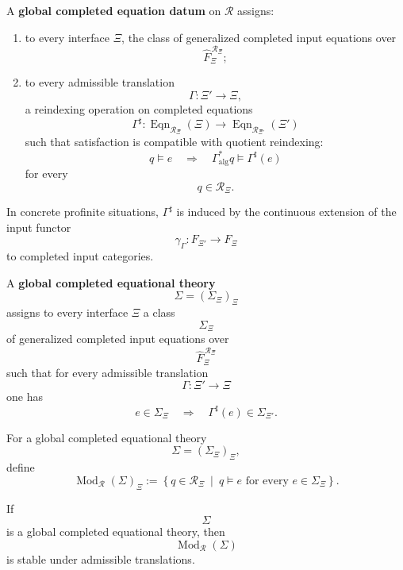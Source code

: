 \begin{definition}
\label{def:eilenberg-global-completed-equation-datum}
A \textbf{global completed equation datum} on \(\mathcal R\) assigns:
\begin{enumerate}
\item to every interface \(\Xi\), the class of generalized completed input
equations over
\[
\widehat F_\Xi^{\,\mathcal R_\Xi};
\]
\item to every admissible translation
\[
\Gamma:\Xi'\to\Xi,
\]
a reindexing operation on completed equations
\[
\Gamma^\sharp:
\operatorname{Eqn}_{\mathcal R_\Xi}(\Xi)
\to
\operatorname{Eqn}_{\mathcal R_{\Xi'}}(\Xi')
\]
such that satisfaction is compatible with quotient reindexing:
\[
q\models e
\quad\Longrightarrow\quad
\Gamma_{\mathrm{alg}}^\ast q\models \Gamma^\sharp(e)
\]
for every
\[
q\in\mathcal R_\Xi.
\]
\end{enumerate}
\end{definition}

In concrete profinite situations, \(\Gamma^\sharp\) is induced by the
continuous extension of the input functor
\[
\gamma_\Gamma:F_{\Xi'}\to F_\Xi
\]
to completed input categories.

\begin{definition}
\label{def:eilenberg-global-completed-equational-theory}
A \textbf{global completed equational theory}
\[
\Sigma=(\Sigma_\Xi)_\Xi
\]
assigns to every interface \(\Xi\) a class
\[
\Sigma_\Xi
\]
of generalized completed input equations over
\[
\widehat F_\Xi^{\,\mathcal R_\Xi}
\]
such that for every admissible translation
\[
\Gamma:\Xi'\to\Xi
\]
one has
\[
e\in\Sigma_\Xi
\quad\Longrightarrow\quad
\Gamma^\sharp(e)\in\Sigma_{\Xi'}.
\]
\end{definition}

\begin{definition}
\label{def:eilenberg-models-global-equational-theory}
For a global completed equational theory
\[
\Sigma=(\Sigma_\Xi)_\Xi,
\]
define
\[
\operatorname{Mod}_{\mathcal R}(\Sigma)_\Xi
:=
\left\{
q\in\mathcal R_\Xi
\ \middle|\
q\models e\text{ for every }e\in\Sigma_\Xi
\right\}.
\]
\end{definition}

\begin{proposition}
\label{prop:eilenberg-global-models-translation-stable}
If
\[
\Sigma
\]
is a global completed equational theory, then
\[
\operatorname{Mod}_{\mathcal R}(\Sigma)
\]
is stable under admissible translations.
\end{proposition}

